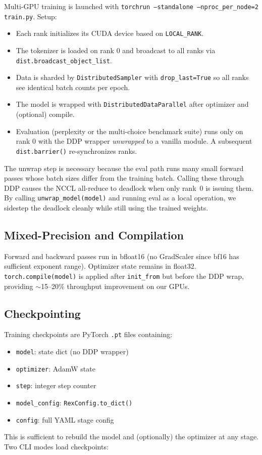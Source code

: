 \documentclass[11pt,a4paper]{article}
\begin{document}
Multi-GPU training is launched with
\texttt{torchrun --standalone --nproc\_per\_node=2 train.py}. Setup:

\begin{itemize}[noitemsep,leftmargin=*]
  \item Each rank initializes its CUDA device based on \texttt{LOCAL\_RANK}.
  \item The tokenizer is loaded on rank 0 and broadcast to all ranks via
    \texttt{dist.broadcast\_object\_list}.
  \item Data is sharded by \texttt{DistributedSampler} with
    \texttt{drop\_last=True} so all ranks see identical batch counts per
    epoch.
  \item The model is wrapped with \texttt{DistributedDataParallel} after
    optimizer and (optional) compile.
  \item Evaluation (perplexity or the multi-choice benchmark suite) runs
    only on rank 0 with the DDP wrapper \emph{unwrapped} to a vanilla module.
    A subsequent \texttt{dist.barrier()} re-synchronizes ranks.
\end{itemize}

The unwrap step is necessary because the eval path runs many small forward
passes whose batch sizes differ from the training batch. Calling these
through DDP causes the NCCL all-reduce to deadlock when only rank~0 is
issuing them. By calling \texttt{unwrap\_model(model)} and running eval as a
local operation, we sidestep the deadlock cleanly while still using the
trained weights.

\subsection{Mixed-Precision and Compilation}

Forward and backward passes run in bfloat16 (no GradScaler since bf16 has
sufficient exponent range). Optimizer state remains in float32.
\texttt{torch.compile(model)} is applied after \texttt{init\_from} but before
the DDP wrap, providing $\sim$15--20\% throughput improvement on our GPUs.

\subsection{Checkpointing}

Training checkpoints are PyTorch \texttt{.pt} files containing:
\begin{itemize}[noitemsep,leftmargin=*]
  \item \texttt{model}: state dict (no DDP wrapper)
  \item \texttt{optimizer}: AdamW state
  \item \texttt{step}: integer step counter
  \item \texttt{model\_config}: \texttt{RexConfig.to\_dict()}
  \item \texttt{config}: full YAML stage config
\end{itemize}
This is sufficient to rebuild the model and (optionally) the optimizer at
any stage. Two CLI modes load checkpoints:
\end{document}
